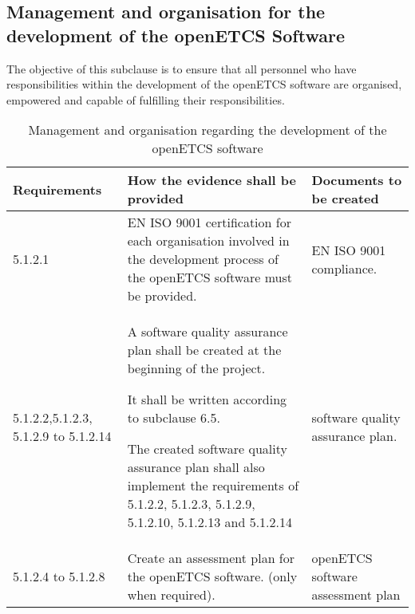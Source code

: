 \documentclass{template/openetcs_report}
\begin{document}
\subsection{Management and organisation for the development of the openETCS Software}
\begin{flushleft}
The objective of this subclause is to ensure that all personnel who have responsibilities within the development of the openETCS software are organised, empowered and capable of fulfilling their responsibilities.
\end{flushleft}
{\footnotesize\sffamily\centering
\begin{longtable}{|p{2cm}|p{9cm}|p{3cm}|}
\caption{Management and organisation regarding the development of the openETCS software}\\
\hline
\bfseries Requirements & \bfseries How the evidence shall be provided & \bfseries Documents to be created\\
\hline
\hline
\endhead
\hline
\endfoot

5.1.2.1 & EN ISO 9001 certification for each organisation involved in the development process of the openETCS software must be provided. & EN ISO 9001 compliance.\\ 
\hline
5.1.2.2,5.1.2.3, 5.1.2.9 to 5.1.2.14 & A software quality assurance plan shall be created at the beginning of the project. 

It shall be written according to subclause 6.5.

The created software quality assurance plan shall also implement the requirements of 5.1.2.2, 5.1.2.3, 5.1.2.9, 5.1.2.10, 5.1.2.13 and 5.1.2.14
& software quality assurance plan.\\ 
\hline
5.1.2.4 to 5.1.2.8 & Create an assessment plan for the openETCS software. (only when required).
& openETCS software assessment plan\\ 
\hline
\end{longtable}}
\end{document}
